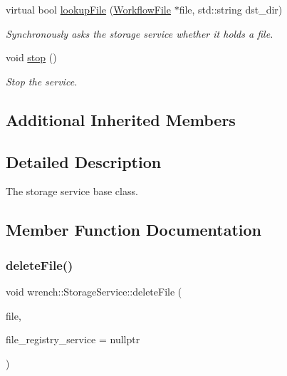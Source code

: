 \begin{DoxyCompactItemize}
virtual bool \hyperlink{classwrench_1_1_storage_service_a348189474e741dab4893213b5bcca1d1}{lookup\+File} (\hyperlink{classwrench_1_1_workflow_file}{Workflow\+File} $\ast$file, std\+::string dst\+\_\+dir)
\begin{DoxyCompactList}\small\item\em Synchronously asks the storage service whether it holds a file. \end{DoxyCompactList}\item 
\mbox{\label{classwrench_1_1_storage_service_a1267ad1722291f56532c283658f31acc}} 
void \hyperlink{classwrench_1_1_storage_service_a1267ad1722291f56532c283658f31acc}{stop} ()
\begin{DoxyCompactList}\small\item\em Stop the service. \end{DoxyCompactList}\end{DoxyCompactItemize}
\subsection*{Additional Inherited Members}


\subsection{Detailed Description}
The storage service base class. 

\subsection{Member Function Documentation}
\mbox{\label{classwrench_1_1_storage_service_a49becac571e80a1a89f2466cad3fc084}} 
\subsubsection{\texorpdfstring{delete\+File()}{deleteFile()}\hspace{0.1cm}{\footnotesize\ttfamily [1/2]}}
{\footnotesize\ttfamily void wrench\+::\+Storage\+Service\+::delete\+File (\begin{DoxyParamCaption}\item[{\hyperlink{classwrench_1_1_workflow_file}{Workflow\+File} $\ast$}]{file,  }\item[{\hyperlink{classwrench_1_1_file_registry_service}{File\+Registry\+Service} $\ast$}]{file\+\_\+registry\+\_\+service = {\ttfamily nullptr} }\end{DoxyParamCaption})\hspace{0.3cm}{\ttfamily [virtual]}}



